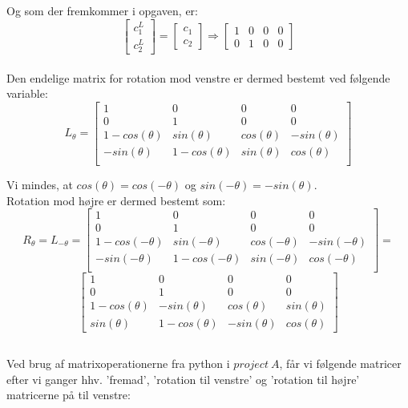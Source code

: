\documentclass[a4paper,12pt]{article}
\begin{document}
Og som der fremkommer i opgaven, er:\\
\[
\left[\begin{array}{ccc}
    c^L_1\\
    c^L_2
\end{array}\right]
=
\left[\begin{array}{ccc}
    c_1\\
    c_2
\end{array}\right]
\Rightarrow
\left[\begin{array}{cccc}
    1 & 0 & 0 & 0\\
    0 & 1 & 0 & 0
\end{array}\right]
\]\\

Den endelige matrix for rotation mod venstre er dermed bestemt ved følgende variable:\\
\[
L_\theta
=
\left[\begin{array}{cccc}
    1 & 0 & 0 & 0\\
    0 & 1 & 0 & 0\\
    1 - cos(\theta) & sin(\theta) & cos(\theta) &  -sin(\theta)\\
    -sin(\theta) & 1 - cos(\theta) & sin(\theta) & cos(\theta)\\
\end{array}\right]
\]

Vi mindes, at $cos(\theta) = cos(-\theta)$ og $sin(-\theta) = -sin(\theta)$.\\
Rotation mod højre er dermed bestemt som:\\

\[
R_\theta = L_{-\theta}=
\left[\begin{array}{cccc}
    1 & 0 & 0 & 0\\
    0 & 1 & 0 & 0\\
    1 - cos(-\theta) & sin(-\theta) & cos(-\theta) &  -sin(-\theta)\\
    -sin(-\theta) & 1 - cos(-\theta) & sin(-\theta) & cos(-\theta)\\
\end{array}\right]
=
\]
\[
\left[\begin{array}{cccc}
    1 & 0 & 0 & 0 \\
    0 & 1 & 0 & 0 \\
    1 - cos(\theta) & -sin(\theta) & cos(\theta) &  sin(\theta)\\
    sin(\theta) & 1 - cos(\theta) & -sin(\theta) & cos(\theta)
\end{array}\right]
\]

\subsection{}
Ved brug af matrixoperationerne fra python i $project \ A$, får vi følgende matricer efter vi ganger hhv. 'fremad', 'rotation til venstre' og 'rotation til højre' matricerne på til venstre:\\
\end{document}

